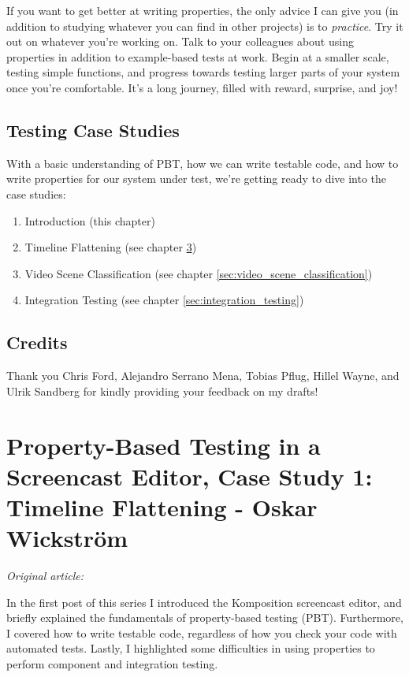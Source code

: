 If you want to get better at writing properties, the only advice I can give you (in addition to studying whatever you can find in other projects) is to \textit{practice}. Try it out on whatever you're working on. Talk to your colleagues about using properties in addition to example-based tests at work. Begin at a smaller scale, testing simple functions, and progress towards testing larger parts of your system once you're comfortable. It's a long journey, filled with reward, surprise, and joy!

\section{Testing Case Studies}


With a basic understanding of PBT, how we can write testable code, and how to write properties for our system under test, we're getting ready to dive into the case studies:

\begin{enumerate}
\item Introduction (this chapter)
\item Timeline Flattening (see chapter \ref{sec:timeline_flattening})
\item Video Scene Classification (see chapter \ref{sec:video_scene_classification})
\item Integration Testing (see chapter \ref{sec:integration_testing})
\end{enumerate}


\section{Credits}

Thank you Chris Ford, Alejandro Serrano Mena, Tobias Pflug, Hillel Wayne, and Ulrik Sandberg for kindly providing your feedback on my drafts!


\chapter{Property-Based Testing in a Screencast Editor, Case Study 1: Timeline Flattening - Oskar Wickstr\"om}
\label{sec:timeline_flattening}

\vspace{\baselineskip}
\noindent\textit{Original article: \cite{timeline_flattening}}
\vspace{\baselineskip}

\noindent In the first post of this series I introduced the Komposition screencast editor, and briefly explained the fundamentals of property-based testing (PBT). Furthermore, I covered how to write testable code, regardless of how you check your code with automated tests. Lastly, I highlighted some difficulties in using properties to perform component and integration testing.

